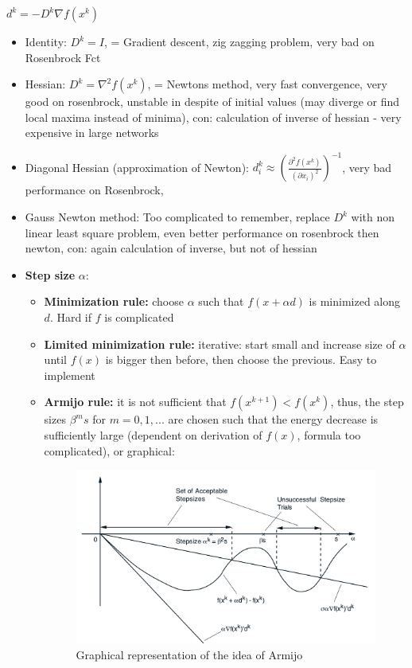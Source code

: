 \documentclass{report}
\begin{document}
\begin{enumerate}
  $d^k = -D^k \nabla f (x^k )$
  \begin{itemize}
  \item Identity: $D^k = I$, = Gradient descent, zig zagging problem, very bad on Rosenbrock Fct
  \item Hessian: $D^k = \nabla^2 f(x^k)$, = Newtons method, very fast convergence, very good on
    rosenbrock, unstable in despite of initial values (may diverge or find local maxima instead of
    minima), con: calculation of inverse of hessian - very expensive in large networks
  \item Diagonal Hessian (approximation of Newton):
    $d_i^k \approx \left( \frac{\partial^2 f (x^k)}{(\partial x_i)^2} \right)^{-1}$, very bad
    performance on Rosenbrock,
  \item Gauss Newton method: Too complicated to remember, replace $D^k$ with non linear least square
    problem, even better performance on rosenbrock then newton, con: again calculation of inverse,
    but not of hessian
  \item \textbf{Step size} $\alpha$:
    \begin{itemize}
    \item \textbf{Minimization rule:} choose $\alpha$ such that $f(x + \alpha d)$ is minimized along
      $d$. Hard if $f$ is complicated
    \item \textbf{Limited minimization rule:} iterative: start small and increase size of $\alpha$
      until $f(x)$ is bigger then before, then choose the previous. Easy to implement
    \item \textbf{Armijo rule:} it is not sufficient that $f(x^{k+1}) < f(x^k)$, thus, the step
      sizes $\beta^ms$ for $m = 0,1,...$ are chosen such that the energy decrease is sufficiently
      large (dependent on derivation of $f(x)$, formula too complicated), or graphical:
      \begin{figure}[H]
	\includegraphics[width=\textwidth]{armijo.png}
	\caption{Graphical representation of the idea of Armijo\label{fig:desc_dir}}
	\end{figure}		
    \end{itemize}
  \end{itemize}


\end{enumerate}
\end{document}
